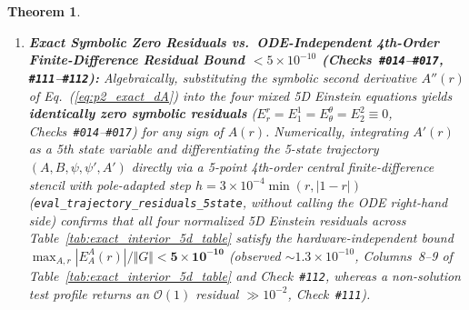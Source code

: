 \documentclass[11pt,a4paper]{article}
\theoremstyle{plain}
\newtheorem{theorem}{Theorem}[section]
\theoremstyle{definition}
\theoremstyle{remark}
\numberwithin{equation}{section}
\begin{document}
\begin{theorem}
\begin{enumerate}
    \item[\textnormal{(iv)}] \textbf{Exact Symbolic Zero Residuals vs.\ ODE-Independent 4th-Order Finite-Difference Residual Bound $< 5 \times 10^{-10}$ (Checks~\texttt{\#014}--\texttt{\#017}, \texttt{\#111}--\texttt{\#112}):} Algebraically, substituting the symbolic second derivative $A''(r)$ of Eq.~(\ref{eq:p2_exact_dA}) into the four mixed 5D Einstein equations yields \textbf{identically zero symbolic residuals} ($E^r_r = E^1_1 = E^{\theta}_{\theta} = E^2_2 \equiv 0$, Checks~\texttt{\#014}--\texttt{\#017}) for any sign of $A(r)$. Numerically, integrating $A'(r)$ as a 5th state variable and differentiating the 5-state trajectory $(A, B, \psi, \psi', A')$ directly via a 5-point 4th-order central finite-difference stencil with pole-adapted step $h = 3 \times 10^{-4}\min(r, |1-r|)$ (\texttt{eval\_trajectory\_residuals\_5state}, without calling the ODE right-hand side) confirms that all four normalized 5D Einstein residuals across Table~\ref{tab:exact_interior_5d_table} satisfy the hardware-independent bound $\max_{A,r}|E^A_A(r)|/\Vert G\Vert < \mathbf{5 \times 10^{-10}}$ (observed $\sim 1.3 \times 10^{-10}$, Columns~8--9 of Table~\ref{tab:exact_interior_5d_table} and Check~\texttt{\#112}, whereas a non-solution test profile returns an $\mathcal{O}(1)$ residual $\gg 10^{-2}$, Check~\texttt{\#111}).
\end{enumerate}
\end{theorem}
\end{document}

